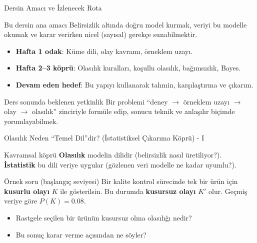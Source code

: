 \documentclass[light]{lutbeamer}
\begin{document}
\begin{frame}{Dersin Amacı ve İzlenecek Rota}
    \begin{block}{Bu dersin ana amacı}
        Belirsizlik altında doğru model kurmak, veriyi bu modelle okumak ve
        karar verirken nicel (sayısal) gerekçe sunabilmektir.
    \end{block}

    \begin{itemize}
        \item \textbf{Hafta 1 odak}: Küme dili, olay kavramı, örneklem uzayı.
        \item \textbf{Hafta 2--3 köprü}: Olasılık kuralları, koşullu olasılık, bağımsızlık, Bayes.
        \item \textbf{Devam eden hedef}: Bu yapıyı kullanarak tahmin, karşılaştırma ve çıkarım.
    \end{itemize}

    \begin{alertblock}{Ders sonunda beklenen yetkinlik}
        Bir problemi ``deney $\rightarrow$ örneklem uzayı $\rightarrow$ olay $\rightarrow$ olasılık'' zinciriyle
        formüle edip, sonucu teknik ve anlaşılır biçimde yorumlayabilmek.
    \end{alertblock}
\end{frame}

\begin{frame}{Olasılık Neden ``Temel Dil''dir? (İstatistiksel Çıkarıma Köprü) - I}
    \begin{block}{Kavramsal köprü}
        \textbf{Olasılık} modelin dilidir (belirsizlik nasıl üretiliyor?). \\
        \textbf{İstatistik} bu dili veriye uygular (gözlenen veri modelle ne kadar uyumlu?).
    \end{block}

    \begin{exampleblock}{Örnek soru (başlangıç seviyesi)}
        Bir kalite kontrol sürecinde tek bir ürün için
        \textbf{kusurlu olayı} $K$ ile gösterilsin.
        Bu durumda \textbf{kusursuz olayı} $K'$ olur.
        Geçmiş veriye göre $P(K)=0.08$.
        \begin{itemize}
            \item Rastgele seçilen bir ürünün kusursuz olma olasılığı nedir?
            \item Bu sonuç karar verme açısından ne söyler?
        \end{itemize}
    \end{exampleblock}
\end{frame}
\end{document}
